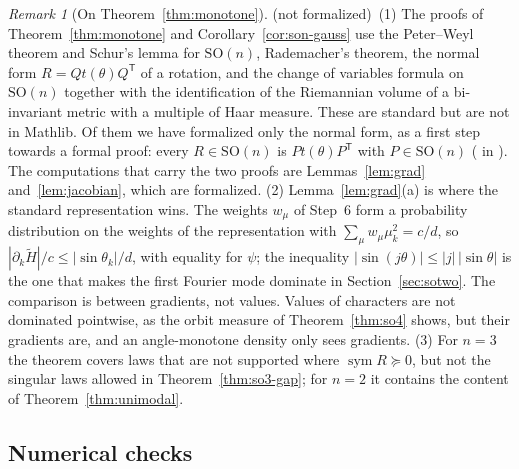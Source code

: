 \documentclass[11pt]{amsart}
\theoremstyle{definition}
\theoremstyle{remark}
\newtheorem{remark}[theorem]{Remark}
\newcommand{\lname}[1]{\texttt{\detokenize{#1}}}
\newcommand{\notformal}{\textup{(not formalized)}}
\newcommand{\SO}{\mathrm{SO}}
\newcommand{\sym}{\operatorname{sym}}
\newcommand{\transp}{^{\mathsf T}}
\begin{document}
\begin{remark}[On Theorem~\ref{thm:monotone}]\label{rem:monotone}
\notformal\ (1) The proofs of Theorem~\ref{thm:monotone} and Corollary~\ref{cor:son-gauss} use the
Peter--Weyl theorem and Schur's lemma for $\SO(n)$, Rademacher's theorem, the normal form
$R=Qt(\theta)Q\transp$ of a rotation, and the change of variables formula on $\SO(n)$ together
with the identification of the Riemannian volume of a bi-invariant metric with a multiple of
Haar measure.  These are standard but are not in Mathlib.  Of them we have formalized only the
normal form, as a first step towards a formal proof: every $R\in\SO(n)$ is $Pt(\theta)P\transp$
with $P\in\SO(n)$ (\lname{exists_torusMat_conj} in ).  The
computations that carry the two proofs are Lemmas~\ref{lem:grad} and~\ref{lem:jacobian}, which
are formalized.
(2) Lemma~\ref{lem:grad}(a) is where the standard representation wins.  The weights $w_\mu$ of
Step~6 form a probability distribution on the weights of the representation with
$\sum_\mu w_\mu\mu_k^2=c/d$, so $|\partial_k\tilde H|/c\le|\sin\theta_k|/d$, with equality for
$\psi$; the inequality $|\sin(j\theta)|\le|j|\,|\sin\theta|$ is the one that makes the first
Fourier mode dominate in Section~\ref{sec:sotwo}.  The comparison is between gradients, not
values.  Values of characters are not dominated pointwise, as the orbit measure of
Theorem~\ref{thm:so4} shows, but their gradients are, and an angle-monotone density only sees
gradients.
(3) For $n=3$ the theorem covers laws that are not supported where $\sym R\succeq0$, but not the
singular laws allowed in Theorem~\ref{thm:so3-gap}; for $n=2$ it contains the content of
Theorem~\ref{thm:unimodal}.
\end{remark}

\subsection{Numerical checks}
\end{document}

